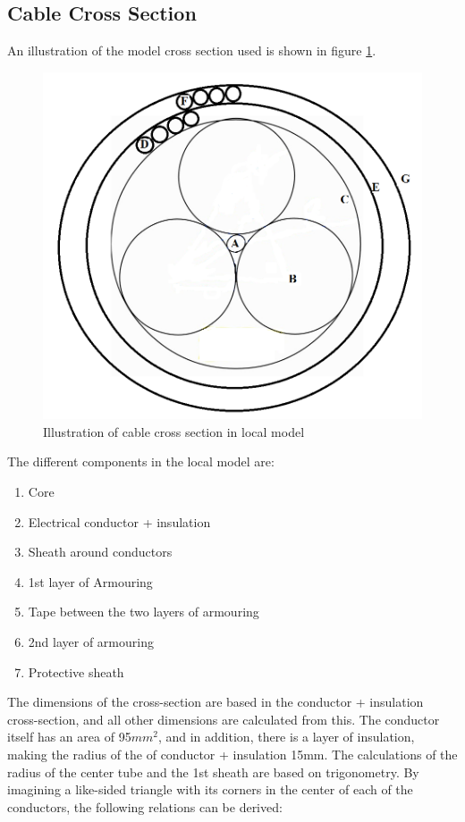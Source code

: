 \subsection{Cable Cross Section}
 An illustration of the model cross section used is shown in figure \ref{fig:cross2}. 

\begin{figure}[H]
\centering
\includegraphics[scale=0.6]{figures/cross2}
\caption[$\; \:$Cable cross section in local model]{Illustration of cable cross section in local model  }
 \label{fig:cross2}
\end{figure}

\noindent The different components in the local model are:
\begin{enumerate}[label=\Alph*]
\item Core
\item Electrical conductor + insulation
\item Sheath around conductors
\item 1st layer of Armouring 
\item Tape between the two layers of armouring
\item 2nd layer of armouring
\item Protective sheath
\end{enumerate}

\noindent The dimensions of the cross-section are based in the conductor + insulation cross-section, and all other dimensions are calculated from this. The conductor itself has an area of 95$mm^2$, and in addition, there is a layer of insulation, making the radius of the of conductor + insulation 15mm.  The calculations of the radius of the center tube and the 1st sheath are based on trigonometry. By imagining a like-sided triangle with its corners in the center of each of the conductors, the following relations can be derived: 


